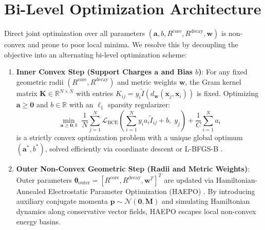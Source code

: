 \documentclass[times, review, 10pt]{elsarticle}
\begin{document}
\section{Bi-Level Optimization Architecture}
\label{sec:optimization}
Direct joint optimization over all parameters $(\mathbf{a}, b, R^{\mathrm{core}}, R^{\mathrm{decay}}, \mathbf{w})$ is non-convex and prone to poor local minima. We resolve this by decoupling the objective into an alternating bi-level optimization scheme:
\begin{enumerate}
    \item \textbf{Inner Convex Step (Support Charges $\mathbf{a}$ and Bias $b$)}: For any fixed geometric radii $(R^{\mathrm{core}}, R^{\mathrm{decay}})$ and metric weights $\mathbf{w}$, the Gram kernel matrix $\mathbf{K} \in \mathbb{R}^{N \times N}$ with entries $K_{ij} = y_i \tilde{I}(d_{\mathbf{w}}(\mathbf{x}_j, \mathbf{x}_i))$ is fixed. Optimizing $\mathbf{a} \ge \mathbf{0}$ and $b \in \mathbb{R}$ with an $\ell_1$ sparsity regularizer:
    \begin{equation}
    \min_{\mathbf{a} \ge \mathbf{0}, b} \; \frac{1}{N}\sum_{j=1}^N \mathcal{L}_{\mathrm{BCE}}\left(\sum_{i=1}^N y_i a_i \tilde{I}_{ij} + b, \; y_j\right) + \frac{1}{C} \sum_{i=1}^N a_i
    \label{eq:inner_convex}
    \end{equation}
    is a strictly convex optimization problem with a unique global optimum $(\mathbf{a}^*, b^*)$, solved efficiently via coordinate descent or L-BFGS-B \cite{byrd1995limited}.
    \item \textbf{Outer Non-Convex Geometric Step (Radii and Metric Weights)}: Outer parameters $\boldsymbol{\theta}_{\mathrm{outer}} = [R^{\mathrm{core}}, R^{\mathrm{decay}}, \mathbf{w}^T]^T$ are updated via Hamiltonian-Annealed Electrostatic Parameter Optimization (HAEPO) \cite{neal2011mcmc,chen2018neural}. By introducing auxiliary conjugate momenta $\mathbf{p} \sim \mathcal{N}(\mathbf{0}, \mathbf{M})$ and simulating Hamiltonian dynamics along conservative vector fields, HAEPO escapes local non-convex energy basins.
\end{enumerate}
\end{document}
